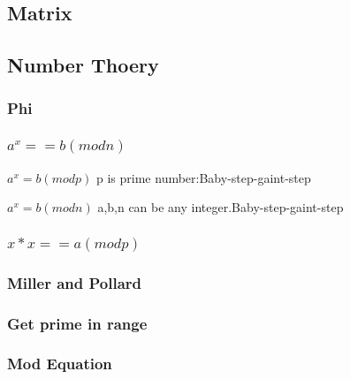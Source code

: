 \documentclass[a4paper,5pt,twocolumn,titlepage]{article}
\begin{document}
\begin{CJK*}{GBK}{song}
    \subsection{Matrix}
        
    \subsection{Number Thoery}
        \subsubsection{Phi}
             
        \subsubsection{$a^x == b(mod n)$}
            $a^x=b(mod p)$ p is prime number:Baby-step-gaint-step
            
            $a^x=b(mod n)$ a,b,n can be any integer.Baby-step-gaint-step
            
        \subsubsection{$x*x == a (mod p)$}
            
        \subsubsection{Miller and Pollard}
            
%     
        \subsubsection{Get prime in range}
            
        \subsubsection{Mod Equation}
             

\end{CJK*}
\end{document}
